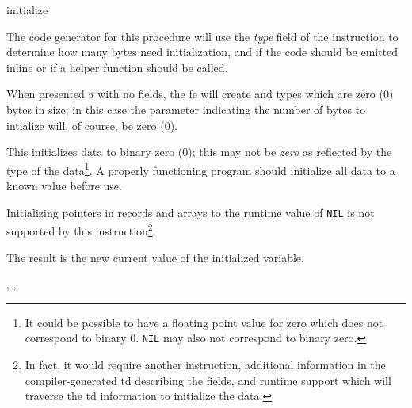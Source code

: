 \begin{instruction}{initialize}

  \begin{notes}
    The code generator for this procedure will use the \emph{type}
    field of the instruction to determine how many bytes need
    initialization, and if the code should be emitted inline or if a
    helper function should be called.

    When presented a  with no fields, the \ac{fe} will
    create  and  types which are zero (0)
    bytes in size; in this case the parameter indicating the number of
    bytes to intialize will, of course, be zero (0).

    This initializes data to binary zero (0); this may not be
    \emph{zero} as reflected by the type of the data\footnote{It could
      be possible to have a floating point value for zero which does
      not correspond to binary 0.  \texttt{NIL} may also not
      correspond to binary zero.}.  A properly functioning program
    should initialize all data to a known value before use.

    Initializing pointers in records and arrays to the runtime value
    of \texttt{NIL} is not supported by this instruction\footnote{In
      fact, it would require another instruction, additional
      information in the compiler-generated \ac{td} describing the
      fields, and runtime support which will traverse the \ac{td}
      information to initialize the data.}.
  \end{notes}

  \begin{results}
  \item The result is the new current value of the initialized
    variable.
  \end{results}

  \begin{operands}
  \item {}
  \item {}
  \item {}
  \end{operands}

  \begin{seealso}
    , ,
  \end{seealso}

\end{instruction}

